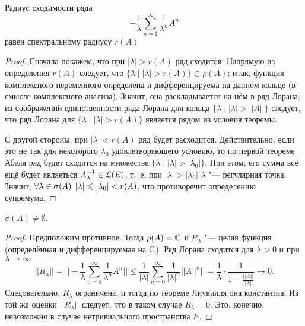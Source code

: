 \documentclass[main]{subfiles}
\begin{document}
\begin{proposition} %
  Радиус сходимости ряда 
  \[
    -\frac1\lambda \sum_{n=1}^\infty \frac1{\lambda^n} A^n
  \]
  равен спектральному радиусу \( r(A) \)
\end{proposition}
\begin{proof}
  Сначала покажем, что при \( |\lambda| > r(A) \)
  ряд сходится.
  Напрямую из определения \( r(A) \)
  следует, что
  \( \{ \lambda \mid |\lambda| > r(A) \} \subset \rho(A) \);
  итак, функция комплексного переменного определена
  и дифференцируема на данном кольце
  (в смысле комплексного анализа).
  Значит, она раскладывается на нём в ряд Лорана;
  из соображений единственности ряда Лорана
  для кольца \( \{ \lambda \mid |\lambda| > ||A|| \} \)
  следует, что ряд Лорана для
  \( \{ \lambda \mid |\lambda| > r(A) \} \)
  является рядом из условия
  теоремы.
 
  С другой стороны, при \( |\lambda| < r(A) \)
  ряд будет расходится.
  Действительно, если это не так для некоторого \( \lambda_0 \)
  удовлетворяющего условию, то
  по первой теореме Абеля
  ряд будет сходится на
  множестве
  \( \{ \lambda \mid |\lambda| > |\lambda_0| \} \).
  При этом, его сумма всё ещё будет
  являеться \( A_\lambda^{-1} \in \Linears{E} \),
  т.~е. при \( |\lambda| > |\lambda_0| \)
  \( \lambda \) "--- регулярная точка.
  Значит, \( \forall {\lambda \in \sigma(A)} \; \,
  |\lambda| \leqslant |\lambda_0| < r(A) \),
  что противоречит определению супремума.
\end{proof}

\begin{proposition} %
  \( \sigma(A) \ne \emptyset \).
\end{proposition}
\begin{proof}
  Предположим противное.
  Тогда \( \rho(A) = \mathbb{C} \)
  и \( R_\lambda \) "--- целая функция
  (определённая и дифференцируемая на \( \mathbb{C} \)).
  Ряд Лорана сходится для \( \lambda > 0 \) и
  при \( \lambda \to \infty \)
  \[
    ||R_\lambda|| =
    ||-\frac{1}{\lambda} \sum_{n=0}^\infty \frac{1}{\lambda^n} A^n|| \le
    \frac{1}{|\lambda|} \sum_{n=0}^\infty \frac{1}{|\lambda|^n} ||A||^n|| =
    \frac{1}{\lambda} \cdot \frac{1}{1 - \frac{||A||}{|\lambda|}} \to 0.
  \]
  Следовательно, \( R_\lambda \) ограничена,
  и тогда по теореме Лиувилля
  она константна.
  Из той же оценки \( ||R_\lambda|| \) следует,
  что в таком случае \( R_\lambda = 0 \).
  Это, конечно, невозможно в случае нетривиального
  пространства \( E \).
\end{proof}
\end{document}

